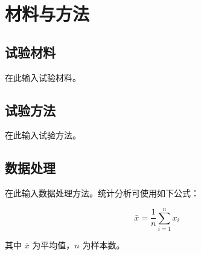 \chapter{材料与方法}

\section{试验材料}

在此输入试验材料。

\section{试验方法}

在此输入试验方法。

\section{数据处理}

在此输入数据处理方法。统计分析可使用如下公式：

\begin{equation}
  \bar{x} = \frac{1}{n} \sum_{i=1}^{n} x_i
  \label{eq:mean}
\end{equation}

其中 $\bar{x}$ 为平均值，$n$ 为样本数。
